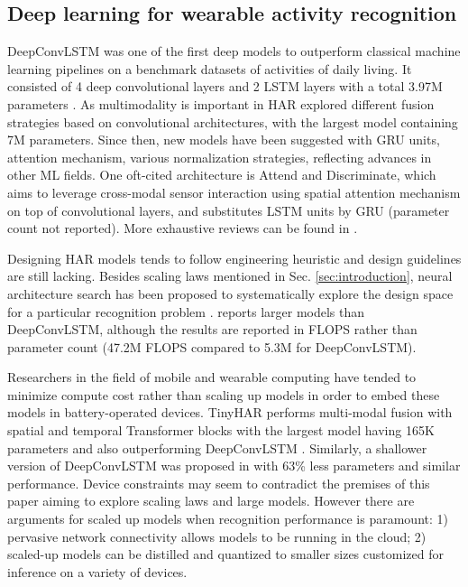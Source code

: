 \subsection{Deep learning for wearable activity recognition}
{DeepConvLSTM} was one of the first deep models to outperform classical machine learning pipelines on a benchmark datasets of activities of daily living. It consisted of 4 deep convolutional layers and 2 LSTM layers with a total 3.97M parameters \cite{Ordonez16a}.
As multimodality is important in HAR \cite{Munzner17} explored different fusion strategies based on convolutional architectures, with the largest model containing 7M parameters.
Since then, new models have been suggested with GRU units, attention mechanism, various normalization strategies, reflecting advances in other {ML} fields. 
One oft-cited architecture is Attend and Discriminate, which aims to leverage cross-modal sensor interaction using spatial attention mechanism on top of convolutional layers, and substitutes LSTM units by GRU \cite{Abedin20} (parameter count not reported).
More exhaustive reviews can be found in \cite{Chen21,Gu21}. 

Designing HAR models tends to follow engineering heuristic and design guidelines are still lacking.  Besides scaling laws mentioned in Sec. \ref{sec:introduction}, neural architecture search has been proposed to systematically explore the design space for a particular recognition problem \cite{Wang21}. \cite{Pellatt22} reports larger models than DeepConvLSTM, although the results are reported in FLOPS rather than parameter count (47.2M FLOPS compared to 5.3M for DeepConvLSTM).

Researchers in the field of mobile and wearable computing have tended to minimize compute cost rather than scaling up models in order to embed these models in battery-operated devices. 
TinyHAR performs multi-modal fusion with spatial and temporal Transformer blocks with the largest model having 165K parameters and also outperforming DeepConvLSTM \cite{Zhou22}. Similarly, a shallower version of DeepConvLSTM was proposed in \cite{Bock21} with 63\% less parameters and similar performance. 
Device constraints may seem to contradict the premises of this paper aiming to explore scaling laws and large models. However there are arguments for scaled up models when recognition performance is paramount: 1) pervasive network connectivity allows models to be running in the cloud; 2) scaled-up models can be distilled and quantized to smaller sizes customized for inference on a variety of devices.


